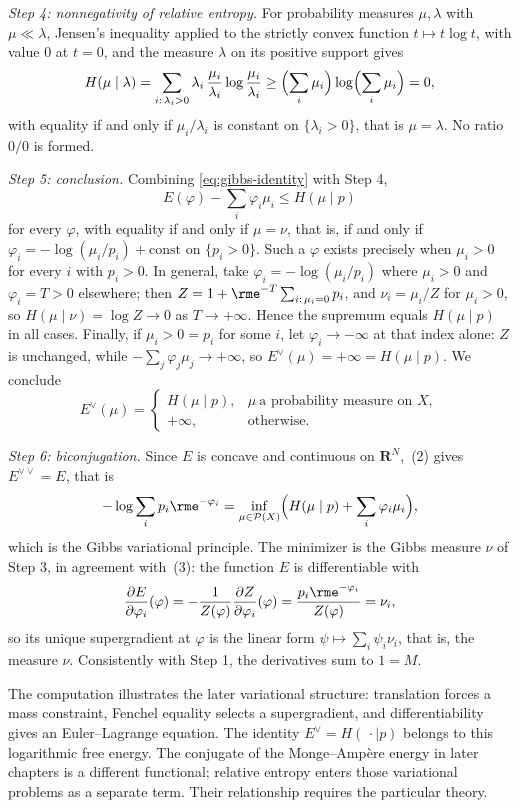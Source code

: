 \begin{example}
\emph{Step 4: nonnegativity of relative entropy.}  For probability measures
$\mu,\lambda$ with $\mu\ll\lambda$, Jensen's inequality applied to the strictly
convex function $t\mapsto t\log t$, with value $0$ at $t=0$, and the measure
$\lambda$ on its positive support gives
\[
 H(\mu\mid\lambda)=\sum_{i:\,\lambda_i>0}\lambda_i\,
 \frac{\mu_i}{\lambda_i}\log\frac{\mu_i}{\lambda_i}
 \geq\Bigl(\sum_i\mu_i\Bigr)\log\Bigl(\sum_i\mu_i\Bigr)=0,
\]
with equality if and only if $\mu_i/\lambda_i$ is constant on
$\{\lambda_i>0\}$, that is $\mu=\lambda$.  No ratio $0/0$ is formed.

\emph{Step 5: conclusion.}  Combining \eqref{eq:gibbs-identity} with Step 4,
\[
 E(\varphi)-\sum_i\varphi_i\mu_i\leq H(\mu\mid p)
\]
for every $\varphi$, with equality if and only if $\mu=\nu$, that is, if and
only if $\varphi_i=-\log(\mu_i/p_i)+\mathrm{const}$ on $\{p_i>0\}$.  Such a
$\varphi$ exists precisely when $\mu_i>0$ for every $i$ with $p_i>0$.  In
general, take $\varphi_i=-\log(\mu_i/p_i)$ where $\mu_i>0$ and
$\varphi_i=T>0$ elsewhere; then $Z=1+\rme^{-T}\sum_{i:\,\mu_i=0}p_i$, and
$\nu_i=\mu_i/Z$ for $\mu_i>0$, so $H(\mu\mid\nu)=\log Z\to0$ as
$T\to+\infty$.  Hence the supremum equals $H(\mu\mid p)$ in all cases.
Finally, if $\mu_i>0=p_i$ for some $i$, let $\varphi_i\to-\infty$ at that
index alone: $Z$ is unchanged, while $-\sum_j\varphi_j\mu_j\to+\infty$, so
$E^\vee(\mu)=+\infty=H(\mu\mid p)$.  We conclude
\begin{equation}
\label{eq:free-energy-dual}
 E^\vee(\mu)=
 \begin{cases}
 H(\mu\mid p), & \mu\ \text{a probability measure on }X,\\
 +\infty, & \text{otherwise}.
 \end{cases}
\end{equation}

\emph{Step 6: biconjugation.}  Since $E$ is concave and continuous on
$\mathbf R^N$, \,(2) gives
$E^{\vee\vee}=E$, that is
\[
 -\log\sum_ip_i\rme^{-\varphi_i}
 =\inf_{\mu\in\mathcal P(X)}
 \Bigl(H(\mu\mid p)+\sum_i\varphi_i\mu_i\Bigr),
\]
which is the Gibbs variational principle.  The minimizer is the Gibbs measure
$\nu$ of Step 3, in agreement with
\,(3): the function $E$ is differentiable
with
\[
 \frac{\partial E}{\partial\varphi_i}(\varphi)
 =-\frac1{Z(\varphi)}\frac{\partial Z}{\partial\varphi_i}(\varphi)
 =\frac{p_i\rme^{-\varphi_i}}{Z(\varphi)}=\nu_i ,
\]
so its unique supergradient at $\varphi$ is the linear form
$\psi\mapsto\sum_i\psi_i\nu_i$, that is, the measure $\nu$.  Consistently with
Step 1, the derivatives sum to $1=M$.

The computation illustrates the later variational structure: translation
forces a mass constraint, Fenchel equality selects a supergradient, and
differentiability gives an Euler--Lagrange equation.  The identity
$E^\vee=H(\,\cdot\mid p)$ belongs to this logarithmic free energy.
The conjugate of the Monge--Amp\`ere energy in later chapters is a different
functional; relative entropy enters those variational problems as a
separate term.  Their relationship requires the particular theory.
\end{example}


